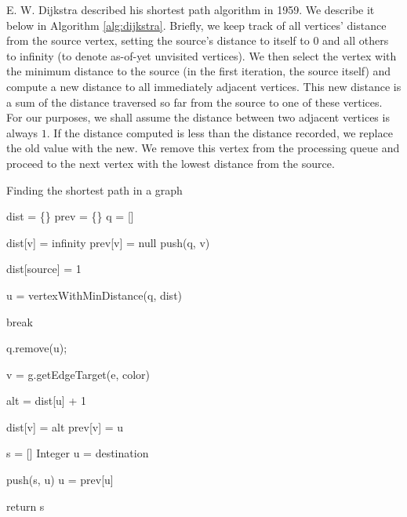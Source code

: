E. W. Dijkstra described his shortest path algorithm in 1959\cite{Dijkstra:1959cw}.  We describe it below in Algorithm \ref{alg:dijkstra}.  Briefly, we keep track of all vertices' distance from the source vertex, setting the source's distance to itself to $0$ and all others to infinity (to denote as-of-yet unvisited vertices).  We then select the vertex with the minimum distance to the source (in the first iteration, the source itself) and compute a new distance to all immediately adjacent vertices.  This new distance is a sum of the distance traversed so far from the source to one of these vertices.  For our purposes, we shall assume the distance between two adjacent vertices is always $1$.  If the distance computed is less than the distance recorded, we replace the old value with the new.  We remove this vertex from the processing queue and proceed to the next vertex with the lowest distance from the source.

\begin{algorithm}
\caption{Finding the shortest path in a graph}
\label{alg:dijkstra}
\begin{algorithmic}[1]
    \State dist = \{\}
    \State prev = \{\}
    \State q = []

        \State dist[v] = infinity
        \State prev[v] = null
        \State push(q, v)
    \EndFor

    \State dist[source] = 1

        \State u = vertexWithMinDistance(q, dist)

            \State break
        \EndIf

        \State q.remove(u);

                \State v = g.getEdgeTarget(e, color)

                \State alt = dist[u] + 1

                    \State dist[v] = alt
                    \State prev[v] = u
                \EndIf
            \EndFor
        \EndIf
    \EndWhile

    \State s = []
    \State Integer u = destination

        \State push(s, u)
        \State u = prev[u]
    \EndWhile

    \State return s
\EndFunction
\end{algorithmic}
\end{algorithm}

